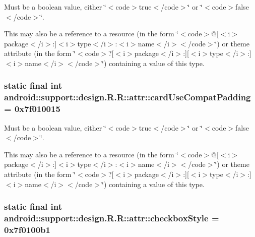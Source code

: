 Must be a boolean value, either \char`\"{}$<$code$>$true$<$/code$>$\char`\"{} or \char`\"{}$<$code$>$false$<$/code$>$\char`\"{}. 

This may also be a reference to a resource (in the form \char`\"{}$<$code$>$@\mbox{[}$<$i$>$package$<$/i$>$:\mbox{]}$<$i$>$type$<$/i$>$:$<$i$>$name$<$/i$>$$<$/code$>$\char`\"{}) or theme attribute (in the form \char`\"{}$<$code$>$?\mbox{[}$<$i$>$package$<$/i$>$:\mbox{]}\mbox{[}$<$i$>$type$<$/i$>$:\mbox{]}$<$i$>$name$<$/i$>$$<$/code$>$\char`\"{}) containing a value of this type. \hypertarget{classandroid_1_1support_1_1design_1_1_r_1_1attr_8e08ff708be7ca040baa79bda63178df}{
\subsubsection[{cardUseCompatPadding}]{\setlength{\rightskip}{0pt plus 5cm}static final int android::support::design.R.R::attr::cardUseCompatPadding = 0x7f010015}}
\label{classandroid_1_1support_1_1design_1_1_r_1_1attr_8e08ff708be7ca040baa79bda63178df}


Must be a boolean value, either \char`\"{}$<$code$>$true$<$/code$>$\char`\"{} or \char`\"{}$<$code$>$false$<$/code$>$\char`\"{}. 

This may also be a reference to a resource (in the form \char`\"{}$<$code$>$@\mbox{[}$<$i$>$package$<$/i$>$:\mbox{]}$<$i$>$type$<$/i$>$:$<$i$>$name$<$/i$>$$<$/code$>$\char`\"{}) or theme attribute (in the form \char`\"{}$<$code$>$?\mbox{[}$<$i$>$package$<$/i$>$:\mbox{]}\mbox{[}$<$i$>$type$<$/i$>$:\mbox{]}$<$i$>$name$<$/i$>$$<$/code$>$\char`\"{}) containing a value of this type. \hypertarget{classandroid_1_1support_1_1design_1_1_r_1_1attr_dce4f8e1221c927f6b3eb4466569b2bf}{
\subsubsection[{checkboxStyle}]{\setlength{\rightskip}{0pt plus 5cm}static final int android::support::design.R.R::attr::checkboxStyle = 0x7f0100b1}}
\label{classandroid_1_1support_1_1design_1_1_r_1_1attr_dce4f8e1221c927f6b3eb4466569b2bf}


